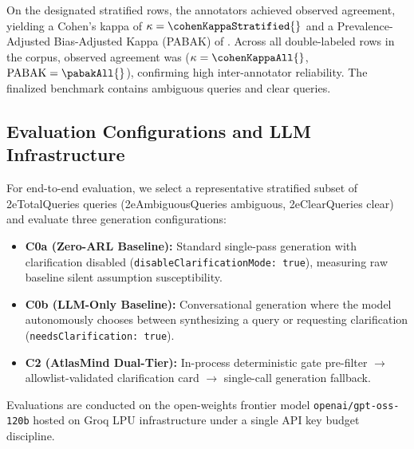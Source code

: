 On the \numDoubleLabelStratified{} designated stratified rows, the annotators achieved \observedAgreementStratified{} observed agreement, yielding a Cohen's kappa of $\kappa = \cohenKappaStratified{}$ and a Prevalence-Adjusted Bias-Adjusted Kappa (PABAK) of \pabakStratified{}. Across all \numDoubleLabelAll{} double-labeled rows in the corpus, observed agreement was \observedAgreementAll{} ($\kappa = \cohenKappaAll{}$, $\text{PABAK} = \pabakAll{}$), confirming high inter-annotator reliability. The finalized benchmark contains \numAmbiguousQueries{} ambiguous queries and \numClearQueries{} clear queries.

\subsection{Evaluation Configurations and LLM Infrastructure}
For end-to-end evaluation, we select a representative stratified subset of \e2eTotalQueries{} queries (\e2eAmbiguousQueries{} ambiguous, \e2eClearQueries{} clear) and evaluate three generation configurations:
\begin{itemize}
    \item \textbf{C0a (Zero-ARL Baseline):} Standard single-pass generation with clarification disabled (\texttt{disableClarificationMode: true}), measuring raw baseline silent assumption susceptibility.
    \item \textbf{C0b (LLM-Only Baseline):} Conversational generation where the model autonomously chooses between synthesizing a query or requesting clarification (\texttt{needsClarification: true}).
    \item \textbf{C2 (AtlasMind Dual-Tier):} In-process deterministic gate pre-filter $\to$ allowlist-validated clarification card $\to$ single-call generation fallback.
\end{itemize}
Evaluations are conducted on the open-weights frontier model \texttt{openai/gpt-oss-120b} hosted on Groq LPU infrastructure under a single API key budget discipline.
